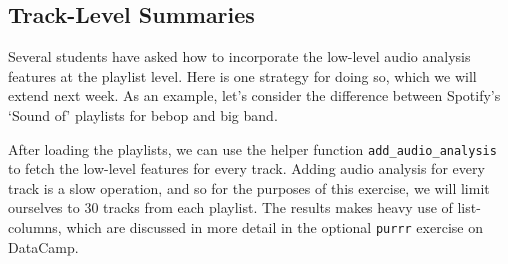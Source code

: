 \documentclass[]{article}
\newenvironment{Shaded}{\begin{snugshade}}{\end{snugshade}}
\newcommand{\DataTypeTok}[1]{\textcolor[rgb]{0.13,0.29,0.53}{#1}}
\newcommand{\DecValTok}[1]{\textcolor[rgb]{0.00,0.00,0.81}{#1}}
\newcommand{\KeywordTok}[1]{\textcolor[rgb]{0.13,0.29,0.53}{\textbf{#1}}}
\newcommand{\NormalTok}[1]{#1}
\newcommand{\OperatorTok}[1]{\textcolor[rgb]{0.81,0.36,0.00}{\textbf{#1}}}
\newcommand{\StringTok}[1]{\textcolor[rgb]{0.31,0.60,0.02}{#1}}
\begin{document}
\hypertarget{track-level-summaries}{%
\subsection{Track-Level Summaries}\label{track-level-summaries}}

Several students have asked how to incorporate the low-level audio
analysis features at the playlist level. Here is one strategy for doing
so, which we will extend next week. As an example, let's consider the
difference between Spotify's `Sound of' playlists for bebop and big
band.

After loading the playlists, we can use the helper function
\texttt{add\_audio\_analysis} to fetch the low-level features for every
track. Adding audio analysis for every track is a slow operation, and so
for the purposes of this exercise, we will limit ourselves to 30 tracks
from each playlist. The results makes heavy use of list-columns, which
are discussed in more detail in the optional \texttt{purrr} exercise on
DataCamp.

\begin{Shaded}
\end{Shaded}
\end{document}
